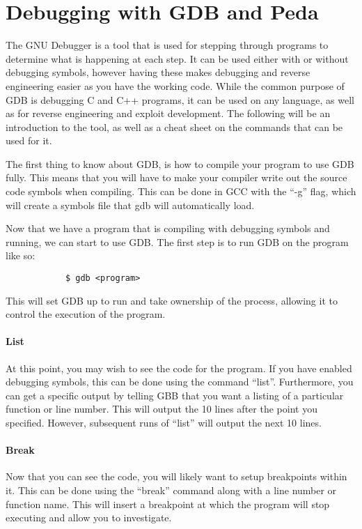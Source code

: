 	\section{Debugging with GDB and Peda}
		The GNU Debugger is a tool that is used for stepping through programs to determine what is happening at each step.
		It can be used either with or without debugging symbols,
		however having these makes debugging and reverse engineering easier as you have the working code.
		While the common purpose of GDB is debugging C and C++ programs, it can be used on any language, as well as for reverse engineering and exploit development.
		The following will be an introduction to the tool, as well as a cheat sheet on the commands that can be used for it.

		The first thing to know about GDB, is how to compile your program to use GDB fully.
		This means that you will have to make your compiler write out the source code symbols when compiling.
		This can be done in GCC with the ``-g'' flag, which will create a symbols file that gdb will automatically load.

		Now that we have a program that is compiling with debugging symbols and running, we can start to use GDB.
		The first step is to run GDB on the program like so:
		\begin{verbatim}
			$ gdb <program>
		\end{verbatim}
		This will set GDB up to run and take ownership of the process, allowing it to control the execution of the program.

		\paragraph{List}
		At this point, you may wish to see the code for the program.
		If you have enabled debugging symbols, this can be done using the command ``list''.
		Furthermore, you can get a specific output by telling GBB that you want a listing of a particular function or line number.
		This will output the 10 lines after the point you specified.
		However, subsequent runs of ``list'' will output the next 10 lines.

		\paragraph{Break}
		Now that you can see the code, you will likely want to setup breakpoints within it.
		This can be done using the ``break'' command along with a line number or function name.
		This will insert a breakpoint at which the program will stop executing and allow you to investigate.

